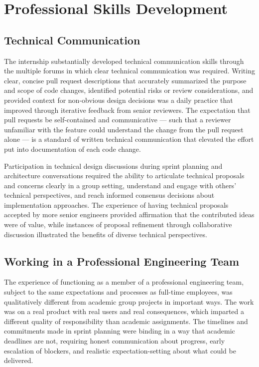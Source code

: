 \section{Professional Skills Development}

\subsection{Technical Communication}

The internship substantially developed technical communication skills through the multiple forums in which clear technical communication was required. Writing clear, concise pull request descriptions that accurately summarized the purpose and scope of code changes, identified potential risks or review considerations, and provided context for non-obvious design decisions was a daily practice that improved through iterative feedback from senior reviewers. The expectation that pull requests be self-contained and communicative — such that a reviewer unfamiliar with the feature could understand the change from the pull request alone — is a standard of written technical communication that elevated the effort put into documentation of each code change.

Participation in technical design discussions during sprint planning and architecture conversations required the ability to articulate technical proposals and concerns clearly in a group setting, understand and engage with others' technical perspectives, and reach informed consensus decisions about implementation approaches. The experience of having technical proposals accepted by more senior engineers provided affirmation that the contributed ideas were of value, while instances of proposal refinement through collaborative discussion illustrated the benefits of diverse technical perspectives.

\subsection{Working in a Professional Engineering Team}

The experience of functioning as a member of a professional engineering team, subject to the same expectations and processes as full-time employees, was qualitatively different from academic group projects in important ways. The work was on a real product with real users and real consequences, which imparted a different quality of responsibility than academic assignments. The timelines and commitments made in sprint planning were binding in a way that academic deadlines are not, requiring honest communication about progress, early escalation of blockers, and realistic expectation-setting about what could be delivered.

